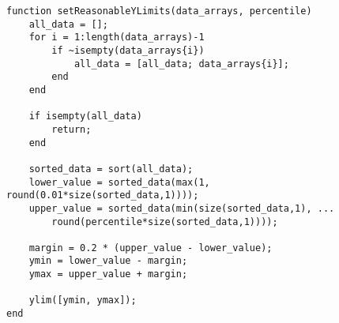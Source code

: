 \documentclass[a4paper,titlepage,11pt,floatssmall]{mwrep} %
\begin{document}
\begin{lstlisting}[style=custommatlab, caption={Pełny kod skryptu \texttt{combined\_plots.m}.}, label={lst:init_full}]
function setReasonableYLimits(data_arrays, percentile)
    all_data = [];
    for i = 1:length(data_arrays)-1
        if ~isempty(data_arrays{i})
            all_data = [all_data; data_arrays{i}];
        end
    end

    if isempty(all_data)
        return;
    end

    sorted_data = sort(all_data);
    lower_value = sorted_data(max(1, round(0.01*size(sorted_data,1))));
    upper_value = sorted_data(min(size(sorted_data,1), ...
        round(percentile*size(sorted_data,1))));

    margin = 0.2 * (upper_value - lower_value);
    ymin = lower_value - margin;
    ymax = upper_value + margin;

    ylim([ymin, ymax]);
end
\end{lstlisting}
\end{document}
